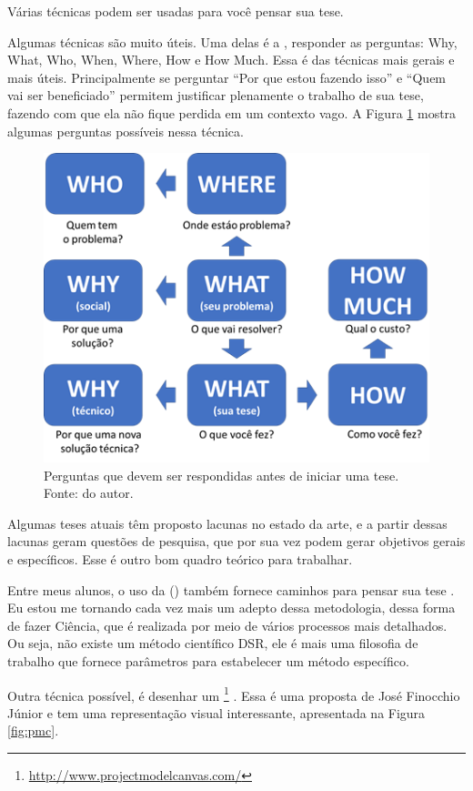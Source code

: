 Várias técnicas podem ser usadas para você pensar sua tese.

Algumas técnicas são muito úteis. Uma delas é a , responder as perguntas: Why, What, Who, When, Where, How e How Much. Essa é das técnicas mais gerais e mais úteis. Principalmente se perguntar “Por que estou fazendo isso” e “Quem vai ser beneficiado” permitem justificar plenamente o trabalho de sua tese, fazendo com que ela não fique perdida em um contexto vago.  A Figura \ref{fig:5w2h} mostra algumas perguntas possíveis nessa técnica.

\begin{figure}[hbt]
    \centering
    \includegraphics[width=0.7\linewidth]{Images/5w2h}
    \caption{Perguntas que devem ser respondidas antes de iniciar uma tese. Fonte: do autor.}
    \label{fig:5w2h}
\end{figure}




Algumas teses atuais têm proposto lacunas no estado da arte, e a partir dessas lacunas geram questões de pesquisa, que por sua vez podem gerar objetivos gerais e específicos. Esse é outro bom quadro teórico para trabalhar.

Entre meus alunos, o uso da  ()\citep{Pimentel2020} também fornece caminhos para pensar sua tese . Eu estou me tornando cada vez mais um adepto dessa metodologia, dessa forma de fazer Ciência, que é realizada por meio de vários processos mais detalhados. Ou seja, não existe um método científico DSR, ele é mais uma filosofia de trabalho que fornece parâmetros para estabelecer um método específico.

Outra técnica possível, é desenhar um \footnote{\url{http://www.projectmodelcanvas.com/}} . Essa é uma proposta de José Finocchio Júnior e tem uma representação visual interessante, apresentada na Figura \ref{fig:pmc}.

